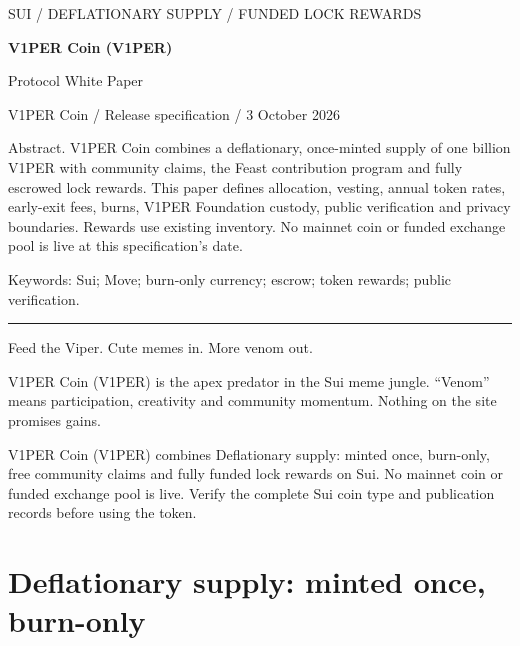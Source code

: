 \documentclass[11pt]{article}
\newcommand{\VOnePER}{\texorpdfstring{V\textcolor{brandone}{1}PER}{V1PER}}
\begin{document}
\begin{center}
{\small\sffamily\color{viper} SUI / DEFLATIONARY SUPPLY / FUNDED LOCK REWARDS}\par\vspace{8pt}
{\LARGE\bfseries \VOnePER{} Coin (\VOnePER{})}\par\vspace{4pt}
{\large Protocol White Paper}\par\vspace{6pt}
{\small \VOnePER{} Coin / Release specification / 3 October 2026}\par\vspace{10pt}
\end{center}
\noindent Abstract. \VOnePER{} Coin combines a deflationary, once-minted supply of one billion \VOnePER{} with community claims, the Feast contribution program and fully escrowed lock rewards. This paper defines allocation, vesting, annual token rates, early-exit fees, burns, \VOnePER{} Foundation custody, public verification and privacy boundaries. Rewards use existing inventory. No mainnet coin or funded exchange pool is live at this specification's date.\par\vspace{6pt}
\noindent Keywords: Sui; Move; burn-only currency; escrow; token rewards; public verification.\par\vspace{10pt}
\hrule\vspace{14pt}
Feed the Viper. Cute memes in. More venom out.

\VOnePER{} Coin (\VOnePER{}) is the apex predator in the Sui meme jungle. ``Venom'' means participation, creativity and community momentum. Nothing on the site promises gains.

\VOnePER{} Coin (\VOnePER{}) combines Deflationary supply: minted once, burn-only, free community claims and fully funded lock rewards on Sui. No mainnet coin or funded exchange pool is live. Verify the complete Sui coin type and publication records before using the token.

\section{Deflationary supply: minted once, burn-only}
\end{document}

